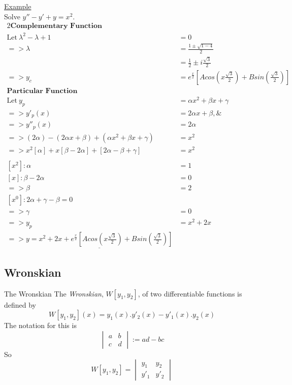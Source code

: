 \documentclass[11pt,a4paper]{article}
\begin{document}
\underline{Example} \\
Solve $y'' -y' + y = x^2$.
\begin{align*}{2}
  \mathrm{\textbf{Complementary\ Function}} \\
  \mathrm{Let\ }\lambda^2 - \lambda + 1 &= 0 \\
  => \lambda &= \frac{1 \pm \sqrt{1-4}}{2} \\
  &= \frac{1}{2} \pm i\frac{\sqrt{3}}{2} \\
  => y_c &= e^{\frac{x}{2}}[A cos(x\frac{\sqrt{3}}{2}) + B sin(\frac{\sqrt{3}}{2})] \\
  \mathrm{\textbf{Particular\ Function}} \\
  \mathrm{Let\ }y_p &= \alpha x^2 + \beta x + \gamma \\
  => y'_p(x) &= 2\alpha x + \beta, \& \\
  => y''_p(x) &= 2\alpha \\
  => (2\alpha) - (2\alpha x + \beta) + (\alpha x^2 + \beta x + \gamma) &= x^2 \\
  => x^2[\alpha] + x[\beta - 2\alpha] + [2\alpha -\beta + \gamma] &= x^2 \\ \\
  [x^2] : \alpha &= 1 \\
  [x] : \beta - 2\alpha &= 0 \\
  =>\beta &= 2 \\
  [x^0] : 2\alpha + \gamma - \beta = 0 \\
  => \gamma &= 0 \\
  => y_p &= x^2 + 2x \\
  => \underline{y = x^2 + 2x + e^{\frac{x}{2}}[A cos(x\frac{\sqrt{3}}{2}) + B sin(\frac{\sqrt{3}}{2})]}
\end{align*}

\subsection{Wronskian}
%
\subtitle{Definition 6.11 - }{The Wronskian}
The \textit{Wronskian}, $W[y_1, y_2]$, of two differentiable functions is defined by $$W[y_1, y_2](x) = y_1(x).y'_2(x) - y'_1(x).y_2(x)$$
The notation for this is $$\begin{vmatrix} a & b \\ c & d \end{vmatrix} := ad - bc$$
So $$W[y_1, y_2] = \begin{vmatrix} y_1 & y_2 \\ y'_1 & y'_2 \end{vmatrix}$$
\end{document}
